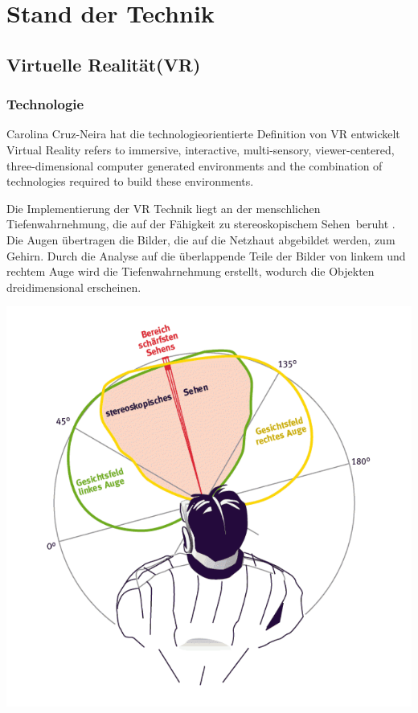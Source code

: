 \section{Stand der Technik}
 \subsection{Virtuelle Realität(VR)}
  \subsubsection{Technologie}
Carolina Cruz-Neira hat die technologieorientierte Definition von VR entwickelt \glqq Virtual Reality refers to immersive, interactive, multi-sensory, viewer-centered, three-dimensional computer generated environments and the combination of technologies required to build these environments.\grqq\ \citep{19}
  
Die Implementierung der VR Technik liegt an der menschlichen Tiefenwahrnehmung, die auf der Fähigkeit zu \glqq stereoskopischem Sehen\grqq\ beruht \citep{20}. Die Augen übertragen die Bilder, die auf die Netzhaut abgebildet werden, zum Gehirn. Durch die Analyse auf die überlappende Teile der Bilder von linkem und rechtem Auge wird die Tiefenwahrnehmung erstellt, wodurch die Objekten dreidimensional erscheinen.

\includegraphics[width=\textwidth]{images/stereoskopischesSehen.png}

